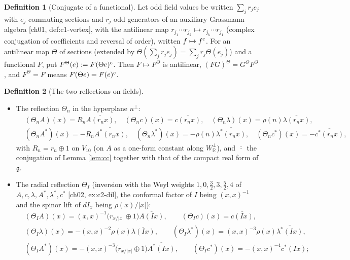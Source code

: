 \documentclass[11pt]{article}
\theoremstyle{definition}
\newtheorem{definition}{Definition}[section]
\begin{document}
\begin{definition}[Conjugate of a functional]
\label{def:Fconj}
Let odd field values be written $\sum_jr_je_j$ with $e_j$ commuting sections and $r_j$ odd generators of an auxiliary Grassmann algebra [ch01, def:c1-vertex], with the antilinear map $r_{j_1}\cdots r_{j_k}\mapsto r_{j_k}\cdots r_{j_1}$ (complex conjugation of coefficients and reversal of order), written $f\mapsto f^{\rm c}$. For an antilinear map $\Theta$ of sections (extended by $\Theta(\sum_jr_je_j)=\sum_jr_j\Theta(e_j)$) and a functional $F$, put $F^\Theta(e):=F(\Theta e)^{\rm c}$. Then $F\mapsto F^\Theta$ is antilinear, $(FG)^\Theta=G^\Theta F^\Theta$, and $F^\Theta=F$ means $F(\Theta e)=F(e)^{\rm c}$.
\end{definition}

\begin{definition}[The two reflections on fields]
\label{def:Theta}
\begin{itemize}
\item The reflection $\Theta_n$ in the hyperplane $n^\perp$:
\[
\begin{aligned}
&(\Theta_nA)(x)=R_n\overline{A(r_nx)},\quad (\Theta_nc)(x)=\overline{c(r_nx)},\quad (\Theta_n\lambda)(x)=\rho(n)\overline{\lambda(r_nx)},\\
&(\Theta_nA^*)(x)=-R_n\overline{A^*(r_nx)},\quad (\Theta_n\lambda^*)(x)=-\rho(n)\overline{\lambda^*(r_nx)},\quad (\Theta_nc^*)(x)=-\overline{c^*(r_nx)},
\end{aligned}
\]
with $R_n=r_n\oplus1$ on $V_{10}$ (on $A$ as a one-form constant along $W^\perp_{\mathbb R}$), and $\overline{\,\cdot\,}$ the conjugation of Lemma \ref{lem:cc} together with that of the compact real form of $\mathfrak g$.
\item The radial reflection $\Theta_I$ (inversion with the Weyl weights $1,0,\tfrac32,3,\tfrac52,4$ of $A,c,\lambda,A^*,\lambda^*,c^*$ [ch02, ex:c2-dil], the conformal factor of $I$ being $(x,x)^{-1}$ and the spinor lift of $dI_x$ being $\rho(x)/|x|$):
\[
\begin{aligned}
&(\Theta_IA)(x)=(x,x)^{-1}\big(r_{x/|x|}\oplus1\big)\overline{A(Ix)},\qquad (\Theta_Ic)(x)=\overline{c(Ix)},\\
&(\Theta_I\lambda)(x)=-(x,x)^{-2}\rho(x)\overline{\lambda(Ix)},\qquad (\Theta_I\lambda^*)(x)=(x,x)^{-3}\rho(x)\overline{\lambda^*(Ix)},\\
&(\Theta_IA^*)(x)=-(x,x)^{-3}\big(r_{x/|x|}\oplus1\big)\overline{A^*(Ix)},\qquad (\Theta_Ic^*)(x)=-(x,x)^{-4}\overline{c^*(Ix)};
\end{aligned}
\]
\end{itemize}
\end{definition}
\end{document}

